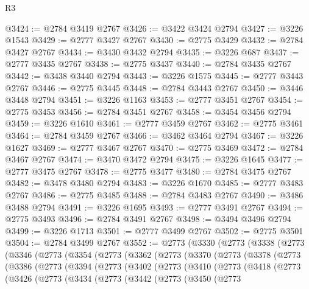 \begin{lexlean}{R3}
\begin{coremodule}
@3424 := @2784 @3419 @2767
@3426 := @3422 @3424 @2794
@3427 := @3226 @1543
@3429 := @2777 @3427 @2767
@3430 := @2775 @3429
@3432 := @2784 @3427 @2767
@3434 := @3430 @3432 @2794
@3435 := @3226 @687
@3437 := @2777 @3435 @2767
@3438 := @2775 @3437
@3440 := @2784 @3435 @2767
@3442 := @3438 @3440 @2794
@3443 := @3226 @1575
@3445 := @2777 @3443 @2767
@3446 := @2775 @3445
@3448 := @2784 @3443 @2767
@3450 := @3446 @3448 @2794
@3451 := @3226 @1163
@3453 := @2777 @3451 @2767
@3454 := @2775 @3453
@3456 := @2784 @3451 @2767
@3458 := @3454 @3456 @2794
@3459 := @3226 @1610
@3461 := @2777 @3459 @2767
@3462 := @2775 @3461
@3464 := @2784 @3459 @2767
@3466 := @3462 @3464 @2794
@3467 := @3226 @1627
@3469 := @2777 @3467 @2767
@3470 := @2775 @3469
@3472 := @2784 @3467 @2767
@3474 := @3470 @3472 @2794
@3475 := @3226 @1645
@3477 := @2777 @3475 @2767
@3478 := @2775 @3477
@3480 := @2784 @3475 @2767
@3482 := @3478 @3480 @2794
@3483 := @3226 @1670
@3485 := @2777 @3483 @2767
@3486 := @2775 @3485
@3488 := @2784 @3483 @2767
@3490 := @3486 @3488 @2794
@3491 := @3226 @1695
@3493 := @2777 @3491 @2767
@3494 := @2775 @3493
@3496 := @2784 @3491 @2767
@3498 := @3494 @3496 @2794
@3499 := @3226 @1713
@3501 := @2777 @3499 @2767
@3502 := @2775 @3501
@3504 := @2784 @3499 @2767
@3552 := @2773
    (@3330
      (@2773
        (@3338
          (@2773
            (@3346
              (@2773
                (@3354
                  (@2773
                    (@3362
                      (@2773
                        (@3370
                          (@2773
                            (@3378
                              (@2773
                                (@3386
                                  (@2773
                                    (@3394
                                      (@2773
                                        (@3402
                                          (@2773
                                            (@3410
                                              (@2773
                                                (@3418
                                                  (@2773
                                                    (@3426
                                                      (@2773
                                                        (@3434
                                                          (@2773
                                                            (@3442
                                                              (@2773
                                                                (@3450
                                                                  (@2773

\end{coremodule}
\end{lexlean}
